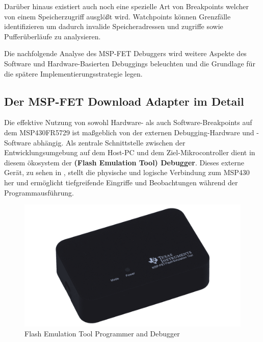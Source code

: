 Dar\"uber hinaus existiert auch noch eine spezielle Art von Breakpoints welcher von einem Speicherzugriff ausgl\"o{\ss}t wird. Watchpoints k\"onnen Grenzf\"alle identifizieren um dadurch invalide Speicheradressen und zugriffe sowie Puffer\"uberl\"aufe zu analysieren. 

Die nachfolgende Analyse des MSP-FET Debuggers wird weitere Aspekte des Software und Hardware-Basierten Debuggings beleuchten und die Grundlage f\"ur die sp\"atere Implementierungsstrategie legen.\AI

\subsection{Der MSP-FET Download Adapter im Detail}
\label{sec:MSP-FET_Debugger}

Die effektive Nutzung von sowohl Hardware- als auch Software-Breakpoints auf dem MSP430FR5729 ist ma{\ss}geblich von der externen Debugging-Hardware und -Software abh\"angig. Als zentrale Schnittstelle zwischen der Entwicklungsumgebung auf dem Host-PC und dem Ziel-Mikrocontroller dient in diesem \"okosystem der \textbf{ (Flash Emulation Tool) Debugger}. Dieses externe Ger\"at, zu sehen in , stellt die physische und logische Verbindung zum MSP430 her und erm\"oglicht tiefgreifende Eingriffe und Beobachtungen w\"ahrend der Programmausf\"uhrung.

\begin{figure}[h!]
	\centering
	\includegraphics[width=1.0\textwidth]{../Bilder/msp_fet.png}
	\caption{Flash Emulation Tool Programmer and Debugger }
	\label{fig:msp_fet}
\end{figure}

